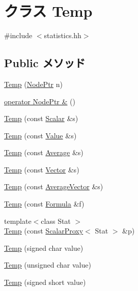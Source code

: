 \hypertarget{classStats_1_1Temp}{
\section{クラス Temp}
\label{classStats_1_1Temp}
}


{\ttfamily \#include $<$statistics.hh$>$}\subsection*{Public メソッド}
\begin{DoxyCompactItemize}
\item 
\hyperlink{classStats_1_1Temp_ae50065936f32602ef6add450b66e4118}{Temp} (\hyperlink{classRefCountingPtr}{NodePtr} n)
\item 
\hyperlink{classStats_1_1Temp_aac20cb971fa60a5cfd36d3f8c32290cb}{operator NodePtr \&} ()
\item 
\hyperlink{classStats_1_1Temp_aa02dfb018c63e8196ff452cdf370f3ed}{Temp} (const \hyperlink{classStats_1_1Scalar}{Scalar} \&s)
\item 
\hyperlink{classStats_1_1Temp_a525d405efbc8ec4d0dbe2fe6f7ec3a27}{Temp} (const \hyperlink{classStats_1_1Value}{Value} \&s)
\item 
\hyperlink{classStats_1_1Temp_a327e351577e2e3ba66e0aef0f804bef9}{Temp} (const \hyperlink{classStats_1_1Average}{Average} \&s)
\item 
\hyperlink{classStats_1_1Temp_a816e31af4e3bc9574b48f56beb859ed3}{Temp} (const \hyperlink{classStats_1_1Vector}{Vector} \&s)
\item 
\hyperlink{classStats_1_1Temp_ab01c5c7ff86acd9ebfe39447408c9638}{Temp} (const \hyperlink{classStats_1_1AverageVector}{AverageVector} \&s)
\item 
\hyperlink{classStats_1_1Temp_a5f7c3083eb56b783e498d2c75154d277}{Temp} (const \hyperlink{classStats_1_1Formula}{Formula} \&f)
\item 
{\footnotesize template$<$class Stat $>$ }\\\hyperlink{classStats_1_1Temp_ae6dec2a8468340e752ecc91c566fcb59}{Temp} (const \hyperlink{classStats_1_1ScalarProxy}{ScalarProxy}$<$ Stat $>$ \&p)
\item 
\hyperlink{classStats_1_1Temp_a32edba37410edef9c104eae1073b6ed4}{Temp} (signed char value)
\item 
\hyperlink{classStats_1_1Temp_a5ad95cfa4b7417e92d285d8bdb68b58c}{Temp} (unsigned char value)
\item 
\hyperlink{classStats_1_1Temp_a007262659fb356af70d3fa073e1f8ecc}{Temp} (signed short value)

\end{DoxyCompactItemize}
